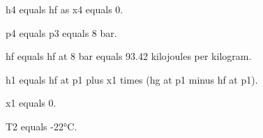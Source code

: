 h4 equals hf as x4 equals 0.  

p4 equals p3 equals 8 bar.  

hf equals hf at 8 bar equals 93.42 kilojoules per kilogram.  

h1 equals hf at p1 plus x1 times (hg at p1 minus hf at p1).  

x1 equals 0.  

T2 equals -22°C.